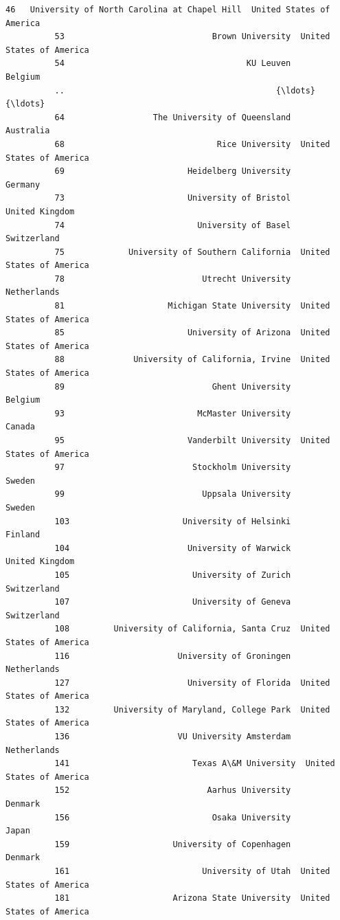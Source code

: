 \documentclass[11pt]{article}
\begin{document}
\begin{Verbatim}[commandchars=\\\{\}]
          46   University of North Carolina at Chapel Hill  United States of America   
          53                              Brown University  United States of America   
          54                                     KU Leuven                   Belgium   
          ..                                           {\ldots}                       {\ldots}   
          64                  The University of Queensland                 Australia   
          68                               Rice University  United States of America   
          69                         Heidelberg University                   Germany   
          73                         University of Bristol            United Kingdom   
          74                           University of Basel               Switzerland   
          75             University of Southern California  United States of America   
          78                            Utrecht University               Netherlands   
          81                     Michigan State University  United States of America   
          85                         University of Arizona  United States of America   
          88              University of California, Irvine  United States of America   
          89                              Ghent University                   Belgium   
          93                           McMaster University                    Canada   
          95                         Vanderbilt University  United States of America   
          97                          Stockholm University                    Sweden   
          99                            Uppsala University                    Sweden   
          103                       University of Helsinki                   Finland   
          104                        University of Warwick            United Kingdom   
          105                         University of Zurich               Switzerland   
          107                         University of Geneva               Switzerland   
          108         University of California, Santa Cruz  United States of America   
          116                      University of Groningen               Netherlands   
          127                        University of Florida  United States of America   
          132         University of Maryland, College Park  United States of America   
          136                      VU University Amsterdam               Netherlands   
          141                         Texas A\&M University  United States of America   
          152                            Aarhus University                   Denmark   
          156                             Osaka University                     Japan   
          159                     University of Copenhagen                   Denmark   
          161                           University of Utah  United States of America   
          181                     Arizona State University  United States of America   
          

\end{Verbatim}
\end{document}
